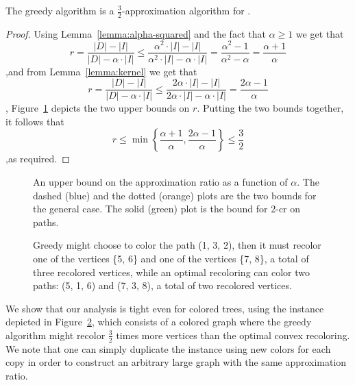 \begin{theorem}
The greedy algorithm is a $\frac{3}{2}$-approximation algorithm for
\TWOCR{}.
\end{theorem}
\begin{proof}
Using Lemma~\ref{lemma:alpha-squared} and the fact that $\alpha \geq 1$ we get
that
$$
r
=    \frac{|D| - |I|}{|D| - \alpha \cdot |I|}
\leq \frac{\alpha ^ 2 \cdot |I| - |I|}{\alpha ^ 2 \cdot |I| - \alpha \cdot |I|}
=    \frac{\alpha ^ 2 - 1}{\alpha ^ 2 - \alpha}
=    \frac{\alpha+1}{\alpha}
$$
,and from Lemma~\ref{lemma:kernel} we get that
$$
r
=    \frac{|D| - |I|}{|D| - \alpha \cdot |I|}
\leq \frac{2 \alpha \cdot |I| - |I|}{2 \alpha \cdot |I| - \alpha \cdot |I|}
=    \frac{2 \alpha - 1}{\alpha}
$$,
Figure~\ref{fig:upper_bound} depicts the two upper bounds on $r$.
Putting the two bounds together, it follows that
\[
r
\leq \min \left\{\frac{\alpha+1}{\alpha} , \frac{2\alpha-1}{\alpha} \right\}
\leq    \frac{3}{2}
\]
,as required.
\end{proof}



\begin{figure}
\centering
{}
\caption[Convex Recoloring - Approximation ratio as function of $\alpha$]{
\label{fig:upper_bound}
An upper bound on the approximation ratio as a function of $\alpha$.
The dashed (blue) and the dotted (orange) plots are the two bounds for the general case.
The solid (green) plot is the bound for 2-cr on paths.
}
\end{figure}

\begin{figure}
\centering
{}
\caption[Convex Recoloring - Tight analysis]{
Greedy might choose to color the path (1, 3, 2), 
then it must recolor one of the vertices \{5, 6\} 
and one of the vertices \{7, 8\}, 
a total of three recolored vertices, 
while an optimal recoloring can color two paths: (5, 1, 6) and (7, 3, 8), 
a total of two recolored vertices.}
\label{fig:tight}
\end{figure}

We show that our analysis is tight even for colored trees, using the
instance depicted in Figure~\ref{fig:tight}, 
which consists of a colored graph where the greedy algorithm might recolor
$\frac{3}{2}$ times more vertices than the optimal convex recoloring.
%
We note that one can simply duplicate the instance using new colors for
each copy in order to construct an arbitrary large graph with the same
approximation ratio.

